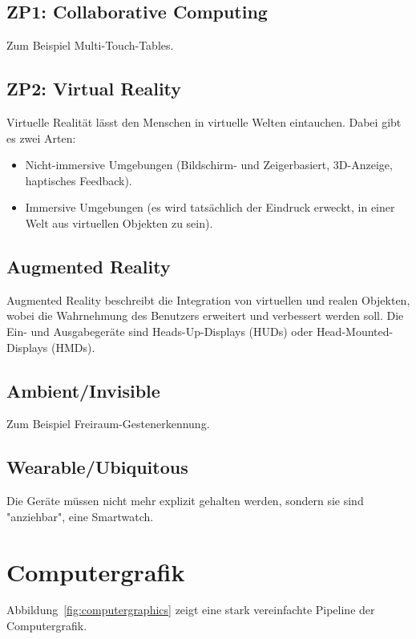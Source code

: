 		\subsection{ZP1: Collaborative Computing}
			Zum Beispiel Multi-Touch-Tables.

		\subsection{ZP2: Virtual Reality}
			Virtuelle Realität lässt den Menschen in virtuelle Welten eintauchen. Dabei gibt es zwei Arten:
			\begin{itemize}
				\item Nicht-immersive Umgebungen (Bildschirm- und Zeigerbasiert, 3D-Anzeige, \mglw haptisches Feedback).
				\item Immersive Umgebungen (es wird tatsächlich der Eindruck erweckt, in einer Welt aus virtuellen Objekten zu sein).
			\end{itemize}

		\subsection{Augmented Reality}
			Augmented Reality beschreibt die Integration von virtuellen und realen Objekten, wobei die Wahrnehmung des Benutzers erweitert und verbessert werden soll. Die Ein- und Ausgabegeräte sind \zB Heads-Up-Displays (HUDs) oder Head-Mounted-Displays (HMDs).

		\subsection{Ambient/Invisible}
			Zum Beispiel Freiraum-Gestenerkennung.

		\subsection{Wearable/Ubiquitous}
			Die Geräte müssen nicht mehr explizit gehalten werden, sondern sie sind "anziehbar", \zB eine Smartwatch.

	\section{Computergrafik}
		Abbildung~\ref{fig:computergraphics} zeigt eine stark vereinfachte Pipeline der Computergrafik.

